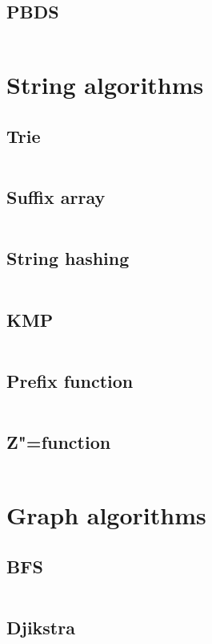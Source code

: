 ﻿\documentclass[10pt,twocolumn,oneside]{article}
\begin{document}
\subsection{PBDS}
\inputminted[breaklines]{cpp}{Data structures/pbds.cpp}

\section{String algorithms}
\subsection{Trie}
\inputminted[breaklines]{cpp}{String algorithms/trie.cpp}
\subsection{Suffix array}
\inputminted[breaklines]{cpp}{String algorithms/suffix array.cpp}
\subsection{String hashing}
\inputminted[breaklines]{cpp}{String algorithms/string hashing.cpp}
\subsection{KMP}
\inputminted[breaklines]{python}{String algorithms/kmp.py}
\subsection{Prefix function}
\inputminted[breaklines]{python}{String algorithms/prefix-function.py}
\subsection{Z"=function}
\inputminted[breaklines]{python}{String algorithms/z-function.py}

\section{Graph algorithms}
\subsection{BFS}
\inputminted[breaklines]{cpp}{Graph algorithms/bfs.cpp}
\subsection{Djikstra}
\inputminted[breaklines]{cpp}{Graph algorithms/djikstra.cpp}
\end{document}

